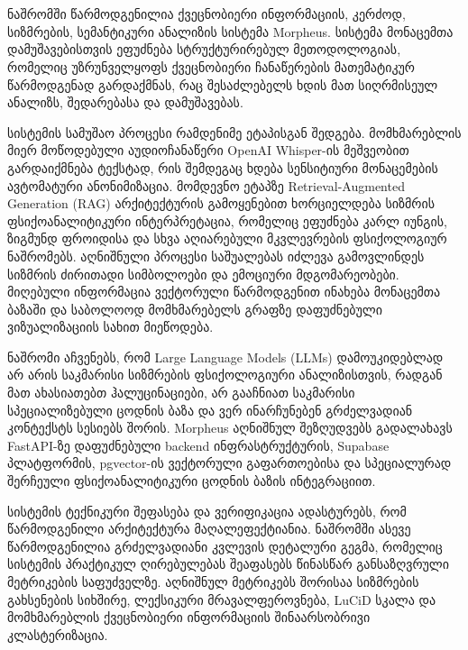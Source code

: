 \documentclass[12pt,a4paper]{report}
\begin{document}
\chapter*{}
\begin{georgian}
ნაშრომში წარმოდგენილია ქვეცნობიერი ინფორმაციის, კერძოდ, სიზმრების, სემანტიკური ანალიზის სისტემა Morpheus. სისტემა მონაცემთა დამუშავებისთვის ეფუძნება სტრუქტურირებულ მეთოდოლოგიას, რომელიც უზრუნველყოფს ქვეცნობიერი ჩანაწერების მათემატიკურ წარმოდგენად გარდაქმნას, რაც შესაძლებელს ხდის მათ სიღრმისეულ ანალიზს, შედარებასა და დამუშავებას.

სისტემის სამუშაო პროცესი რამდენიმე ეტაპისგან შედგება. მომხმარებლის მიერ მოწოდებული აუდიოჩანაწერი OpenAI Whisper-ის მეშვეობით გარდაიქმნება ტექსტად, რის შემდეგაც ხდება სენსიტიური მონაცემების ავტომატური ანონიმიზაცია. მომდევნო ეტაპზე Retrieval-Augmented Generation (RAG) არქიტექტურის გამოყენებით ხორციელდება სიზმრის ფსიქოანალიტიკური ინტერპრეტაცია, რომელიც ეფუძნება კარლ იუნგის, ზიგმუნდ ფროიდისა და სხვა აღიარებული მკვლევრების ფსიქოლოგიურ ნაშრომებს. აღნიშნული პროცესი საშუალებას იძლევა გამოვლინდეს სიზმრის ძირითადი სიმბოლოები და ემოციური მდგომარეობები. მიღებული ინფორმაცია ვექტორული წარმოდგენით ინახება მონაცემთა ბაზაში და საბოლოოდ მომხმარებელს გრაფზე დაფუძნებული ვიზუალიზაციის სახით მიეწოდება.

ნაშრომი აჩვენებს, რომ Large Language Models (LLMs) დამოუკიდებლად არ არის საკმარისი სიზმრების ფსიქოლოგიური ანალიზისთვის, რადგან მათ ახასიათებთ ჰალუცინაციები, არ გააჩნიათ საკმარისი სპეციალიზებული ცოდნის ბაზა და ვერ ინარჩუნებენ გრძელვადიან კონტექსტს სესიებს შორის. Morpheus აღნიშნულ შეზღუდვებს გადალახავს FastAPI-ზე დაფუძნებული backend ინფრასტრუქტურის, Supabase პლატფორმის, pgvector-ის ვექტორული გაფართოებისა და სპეციალურად შერჩეული ფსიქოანალიტიკური ცოდნის ბაზის ინტეგრაციით.

სისტემის ტექნიკური შეფასება და ვერიფიკაცია ადასტურებს, რომ წარმოდგენილი არქიტექტურა მაღალეფექტიანია. ნაშრომში ასევე წარმოდგენილია გრძელვადიანი კვლევის დეტალური გეგმა, რომელიც სისტემის პრაქტიკულ ღირებულებას შეაფასებს წინასწარ განსაზღვრული მეტრიკების საფუძველზე. აღნიშნულ მეტრიკებს შორისაა სიზმრების გახსენების სიხშირე, ლექსიკური მრავალფეროვნება, LuCiD სკალა და მომხმარებლის ქვეცნობიერი ინფორმაციის შინაარსობრივი კლასტერიზაცია.
\end{georgian}
\clearpage
{}
\end{document}

